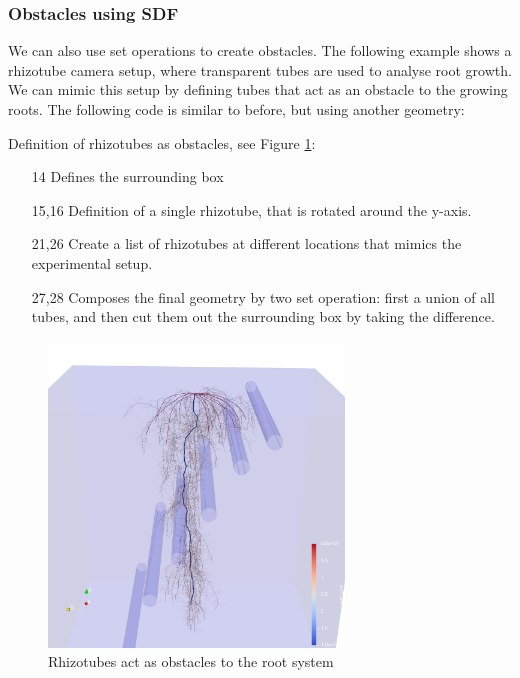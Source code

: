\subsubsection*{Obstacles using SDF}

We can also use set operations to create obstacles. The following example shows a rhizotube camera setup, where transparent tubes are used to analyse root growth. We can mimic this setup by defining tubes that act as an obstacle to the growing roots. The following code is similar to before, but using another geometry: 



Definition of rhizotubes as obstacles, see Figure \ref{fig:topics_virtual3}:
\begin{itemize}
\item[14] Defines the surrounding box 
\item[15,16] Definition of a single rhizotube, that is rotated around the y-axis. 
\item[21,26] Create a list of rhizotubes at different locations that mimics the experimental setup.  
\item[27,28] Composes the final geometry by two set operation: first a union of all tubes, and then cut them out the surrounding box by taking the difference. 
\end{itemize}

\begin{figure}
\centering
\includegraphics[width=0.7\textwidth]{figures/topics_virtual3.png}
\caption{Rhizotubes act as obstacles to the root system} \label{fig:topics_virtual3}
\end{figure}

